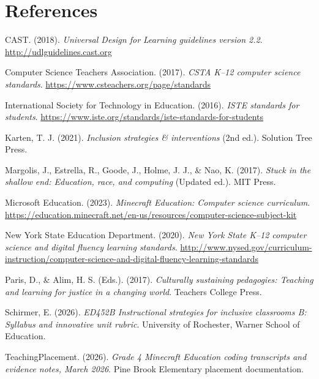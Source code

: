 \documentclass[12pt]{article}
\begin{document}
\section{References}
\begin{flushleft}
\setlength{\parindent}{-0.4in}
\setlength{\leftskip}{0.4in}
\setlength{\parskip}{6pt}

CAST. (2018). \textit{Universal Design for Learning guidelines version 2.2}. \url{http://udlguidelines.cast.org}

Computer Science Teachers Association. (2017). \textit{CSTA K--12 computer science standards}. \url{https://www.csteachers.org/page/standards}

International Society for Technology in Education. (2016). \textit{ISTE standards for students}. \url{https://www.iste.org/standards/iste-standards-for-students}

Karten, T. J. (2021). \textit{Inclusion strategies \& interventions} (2nd ed.). Solution Tree Press.

Margolis, J., Estrella, R., Goode, J., Holme, J. J., \& Nao, K. (2017). \textit{Stuck in the shallow end: Education, race, and computing} (Updated ed.). MIT Press.

Microsoft Education. (2023). \textit{Minecraft Education: Computer science curriculum}. \url{https://education.minecraft.net/en-us/resources/computer-science-subject-kit}

New York State Education Department. (2020). \textit{New York State K--12 computer science and digital fluency learning standards}. \url{http://www.nysed.gov/curriculum-instruction/computer-science-and-digital-fluency-learning-standards}

Paris, D., \& Alim, H. S. (Eds.). (2017). \textit{Culturally sustaining pedagogies: Teaching and learning for justice in a changing world}. Teachers College Press.

Schirmer, E. (2026). \textit{ED452B Instructional strategies for inclusive classrooms B: Syllabus and innovative unit rubric}. University of Rochester, Warner School of Education.

TeachingPlacement. (2026). \textit{Grade 4 Minecraft Education coding transcripts and evidence notes, March 2026}. Pine Brook Elementary placement documentation.

\end{flushleft}
\end{document}
